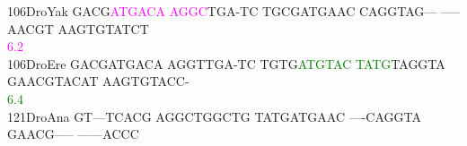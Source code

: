 \documentclass[11pt,twoside,reqno,a4paper]{article}
\begin{document}
{106\hspace*{2\charwidth}DroYak	GACG\textcolor{magenta}{A}\textcolor{magenta}{T}\textcolor{magenta}{G}\textcolor{magenta}{A}\textcolor{magenta}{C}\textcolor{magenta}{A}	\textcolor{magenta}{A}\textcolor{magenta}{G}\textcolor{magenta}{G}\textcolor{magenta}{C}TGA-TC	TGCGATGAAC	CAGGTAG---	-----AACGT	AAGTGTATCT	\\
\hspace*{5\charwidth}\hspace*{7\charwidth}\hspace*{4\charwidth}\textcolor{magenta}{6.2}\hspace*{1\charwidth}\hspace*{1\charwidth}\hspace*{1\charwidth}\hspace*{1\charwidth}\hspace*{1\charwidth}\hspace*{1\charwidth}\\
106\hspace*{2\charwidth}DroEre	GACGATGACA	AGGTTGA-TC	TGTG\textcolor{green}{A}\textcolor{green}{T}\textcolor{green}{G}\textcolor{green}{T}\textcolor{green}{A}\textcolor{green}{C}	\textcolor{green}{T}\textcolor{green}{A}\textcolor{green}{T}\textcolor{green}{G}TAGGTA	GAACGTACAT	AAGTGTACC-	\\
\hspace*{5\charwidth}\hspace*{7\charwidth}\hspace*{1\charwidth}\hspace*{1\charwidth}\hspace*{24\charwidth}\textcolor{green}{6.4}\hspace*{1\charwidth}\hspace*{1\charwidth}\hspace*{1\charwidth}\hspace*{1\charwidth}\\
121\hspace*{2\charwidth}DroAna	GT---TCACG	AGGCTGGCTG	TATGATGAAC	----CAGGTA	GAACG-----	------ACCC	\\
\hspace*{5\charwidth}\hspace*{7\charwidth}\hspace*{1\charwidth}\hspace*{1\charwidth}\hspace*{1\charwidth}\hspace*{1\charwidth}\hspace*{1\charwidth}\hspace*{1\charwidth}\\
}
\end{document}
